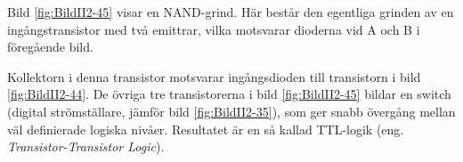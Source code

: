 
Bild \ref{fig:BildII2-45} visar en NAND-grind.
Här består den egentliga grinden av en ingångstransistor med två emittrar,
vilka motsvarar dioderna vid A och B i föregående bild.

Kollektorn i denna transistor motsvarar ingångsdioden till transistorn i bild
\ref{fig:BildII2-44}.
De övriga tre transistorerna i bild \ref{fig:BildII2-45} bildar en switch (digital strömställare, jämför bild \ref{fig:BildII2-35}),
som ger snabb övergång mellan väl definierade logiska nivåer.
Resultatet är en så kallad TTL-logik (eng. \emph{Transistor-Transistor Logic}).
